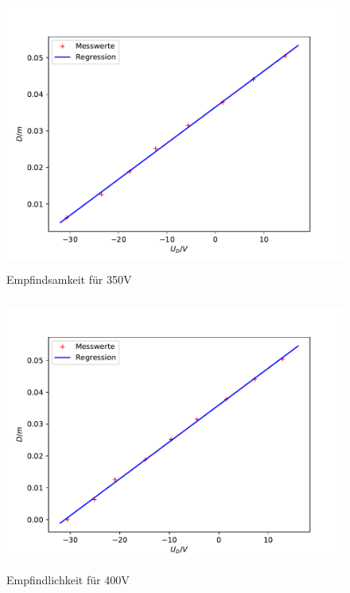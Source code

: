 \begin{figure}[H]
\centering
\includegraphics[height=9cm]{plot350b.pdf}
\caption{Empfindsamkeit für 350V}
\label{fig:350b}
\end{figure}
\begin{figure}[H]
\centering
\includegraphics[height=9cm]{plot300b.pdf}
\caption{Empfindlichkeit für 400V}
\label{fig:400b}
\end{figure}

